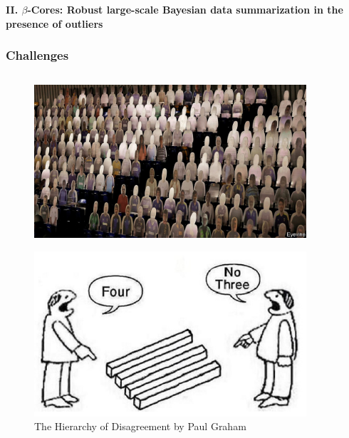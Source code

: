 \documentclass[hyperref={colorlinks = true},unknownkeysallowed]{beamer}
\begin{document}


\begin{frame}
	\LARGE{\textbf{II. $\beta$-Cores: Robust large-scale Bayesian data summarization in the presence of outliers}}
\end{frame}





\begin{frame}[fragile,t]
	\frametitle{Challenges}
	\begin{columns}[onlytextwidth]
		\begin{column}{0.35\textwidth}  %
			\vspace{-1cm} 
			
			\begin{center}
				\begin{figure}
					\includegraphics[width=0.9\textwidth,angle=5]{figs/crowds.jpg}
				\end{figure}
				
				\vspace{-.4cm} 
				
				\begin{figure}
					\includegraphics[width=0.9\textwidth,angle=-5]{figs/Four-No-Three.jpg}
					\caption*{\scriptsize{The Hierarchy of Disagreement by Paul Graham}}
				\end{figure}
				

\end{center}
\end{column}
\end{columns}
\end{frame}
\end{document}
